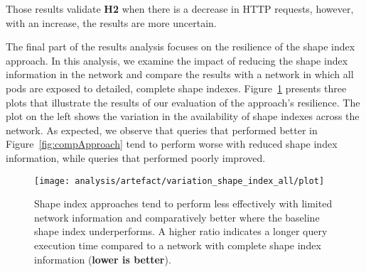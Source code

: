 Those results validate \textbf{H2} when there is a decrease in HTTP requests, however, with an increase, the results are more uncertain.

\fi



The final part of the results analysis focuses on the resilience of the shape index approach.
In this analysis, we examine the impact of reducing the shape index information in the network and compare the results with a network in which all pods are exposed to detailed, complete shape indexes.
Figure~\ref{fig:adaptShapeIndex} presents three plots that illustrate the results of our evaluation of the approach's resilience.
The plot on the left shows the variation in the availability of shape indexes across the network. 
As expected, we observe that queries that performed better in Figure~\ref{fig:compApproach} tend to perform worse with reduced shape index information, while queries that performed poorly improved. 


\begin{figure}
    \centering
    \texttt{[image: analysis/artefact/variation\_shape\_index\_all/plot]}
    \caption{
    Shape index approaches tend to perform less effectively with limited network information and comparatively better where the baseline shape index underperforms.
    A higher ratio indicates a longer query execution time compared to a network with complete shape index information (\textbf{lower is better}).
    }
    \label{fig:adaptShapeIndex}
\end{figure}


